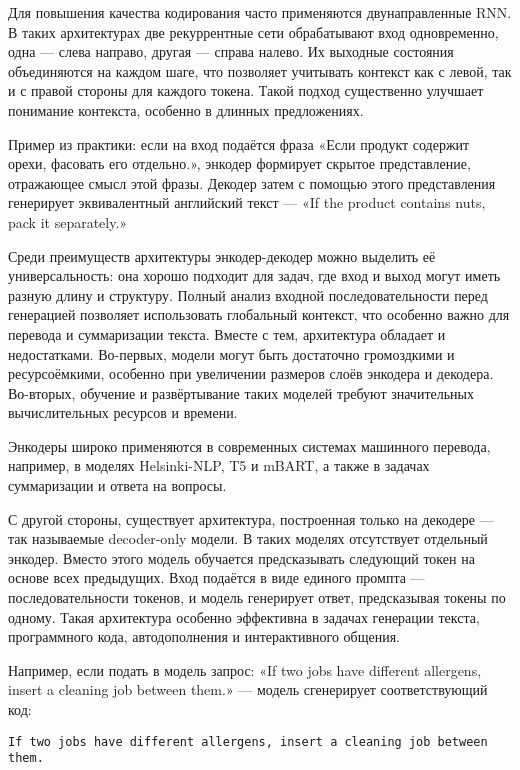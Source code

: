 Для повышения качества кодирования часто применяются двунаправленные RNN. В таких архитектурах две рекуррентные сети обрабатывают вход одновременно, одна — слева направо, другая — справа налево. Их выходные состояния объединяются на каждом шаге, что позволяет учитывать контекст как с левой, так и с правой стороны для каждого токена. Такой подход существенно улучшает понимание контекста, особенно в длинных предложениях.

Пример из практики: если на вход подаётся фраза «Если продукт содержит орехи, фасовать его отдельно.», энкодер формирует скрытое представление, отражающее смысл этой фразы. Декодер затем с помощью этого представления генерирует эквивалентный английский текст — «If the product contains nuts, pack it separately.»

Среди преимуществ архитектуры энкодер-декодер можно выделить её универсальность: она хорошо подходит для задач, где вход и выход могут иметь разную длину и структуру. Полный анализ входной последовательности перед генерацией позволяет использовать глобальный контекст, что особенно важно для перевода и суммаризации текста. Вместе с тем, архитектура обладает и недостатками. Во-первых, модели могут быть достаточно громоздкими и ресурсоёмкими, особенно при увеличении размеров слоёв энкодера и декодера. Во-вторых, обучение и развёртывание таких моделей требуют значительных вычислительных ресурсов и времени.

Энкодеры широко применяются в современных системах машинного перевода, например, в моделях Helsinki-NLP, T5 и mBART, а также в задачах суммаризации и ответа на вопросы.

С другой стороны, существует архитектура, построенная только на декодере — так называемые decoder-only модели. В таких моделях отсутствует отдельный энкодер. Вместо этого модель обучается предсказывать следующий токен на основе всех предыдущих. Вход подаётся в виде единого промпта — последовательности токенов, и модель генерирует ответ, предсказывая токены по одному. Такая архитектура особенно эффективна в задачах генерации текста, программного кода, автодополнения и интерактивного общения.

Например, если подать в модель запрос: «If two jobs have different allergens, insert a cleaning job between them.» — модель сгенерирует соответствующий код:

\begin{lstlisting}[caption={Промпт}, label={lst:prompt_example}]
If two jobs have different allergens, insert a cleaning job between them.
\end{lstlisting}

